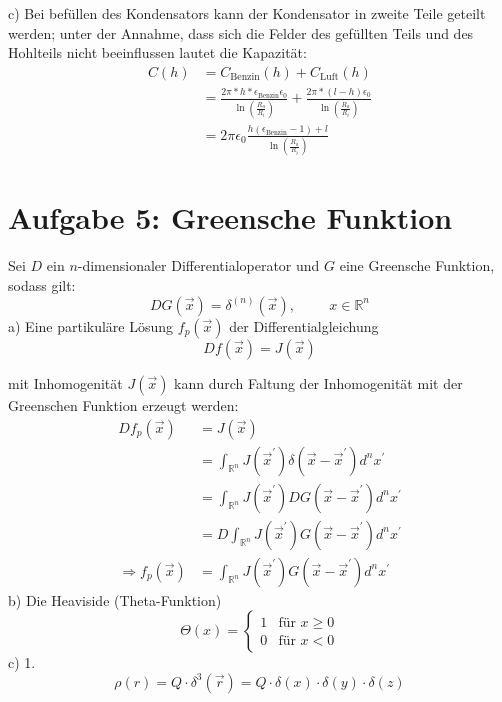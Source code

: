 \documentclass[11pt a4paper]{article}
\newcommand{\epsz}{\epsilon_0}
\begin{document}
\par{c)}
Bei befüllen des Kondensators kann der Kondensator in zweite Teile geteilt
werden; unter der Annahme, dass sich die Felder des gefüllten Teils und des
Hohlteils nicht beeinflussen lautet die Kapazität:
\begin{align*}
	C(h) &= C_\text{Benzin}(h) + C_\text{Luft}(h) \\
	&= \frac{2\pi * h * \epsilon_\text{Benzin} \epsz}
	{\ln\left(\frac{R_a}{R_i}\right)} +
	\frac{2\pi * (l-h)  \epsz}
	{\ln\left(\frac{R_a}{R_i}\right)} \\
	&= 2\pi\epsz \frac{h (\epsilon_\text{Benzin} -1 )+ l}
	{\ln\left(\frac{R_a}{R_i}\right)}
\end{align*}

\newpage

\section*{Aufgabe 5: Greensche Funktion}
Sei $D$ ein $n$-dimensionaler Differentialoperator und $G$ eine Greensche Funktion, sodass 
gilt:
\[
	DG(\vec x) = \delta^{(n)}(\vec x), \hspace{1cm} x \in \mathbb{R}^n
\]
a) Eine partikuläre Lösung $f_p(\vec x)$ der Differentialgleichung
\[
	Df(\vec x) = J(\vec x)
\]

mit Inhomogenität $J(\vec x)$ kann durch Faltung der Inhomogenität mit der
Greenschen Funktion erzeugt werden:
\begin{align*}
	D f_p(\vec x) 
	&= J(\vec x) \\
	&= \int_{\mathbb{R}^n} J(\vec x^\prime)
	\delta(\vec x - \vec x^\prime) d^nx^\prime \\
	&= \int_{\mathbb{R}^n} J(\vec x^\prime) 
	DG(\vec x - \vec x^\prime) d^nx^\prime \\
	&= D \int_{\mathbb{R}^n} J(\vec x^\prime)
	G(\vec x - \vec x^\prime) d^nx^\prime \\
	\Rightarrow
	f_p(\vec x) 
	&=  \int_{\mathbb{R}^n} J(\vec x^\prime)
	G(\vec x - \vec x^\prime) d^nx^\prime
\end{align*}
b) Die Heaviside (Theta-Funktion)
\[
	\Theta (x) = \begin{cases} 
		1 &\text{für } x \geq 0\\
		0 &\text{für } x < 0
	\end{cases}
\]
c) 1.
\[
	\rho (r) = Q \cdot \delta^3(\vec r) 
	= Q \cdot \delta(x) \cdot \delta(y) \cdot \delta(z)
\]
\end{document}
